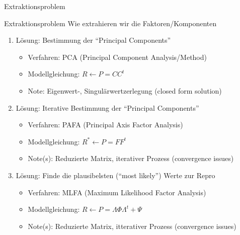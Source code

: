 \documentclass[
  ignorenonframetext,
]{beamer}
\providecommand{\tightlist}{%
  \setlength{\itemsep}{0pt}\setlength{\parskip}{0pt}}
\begin{document}
\begin{frame}{Extraktionsproblem}
\protect\hypertarget{extraktionsproblem}{}
\begin{alertblock}{Extraktionsproblem}
  Wie extrahieren wir die Faktoren/Komponenten 
\end{alertblock}

\begin{enumerate}
\tightlist
\item
  Lösung: Bestimmung der ``Principal Components''

  \begin{itemize}
  \tightlist
  \item
    Verfahren: PCA (Principal Component Analysis/Method)
  \item
    Modellgleichung: \(R \leftarrow P = CC^{t}\)
  \item
    Note: Eigenwert-, Singulärwertzerlegung (closed form solution)
  \end{itemize}
\item
  Lösung: Iterative Bestimmung der ``Principal Components''

  \begin{itemize}
  \tightlist
  \item
    Verfahren: PAFA (Principal Axis Factor Analysis)
  \item
    Modellgleichung: \(R^* \leftarrow P = FF^{t}\)
  \item
    Note(s): Reduzierte Matrix, iterativer Prozess (convergence issues)
  \end{itemize}
\item
  Lösung: Finde die plausibelsten (``most likely'') Werte zur Repro

  \begin{itemize}
  \tightlist
  \item
    Verfahren: MLFA (Maximum Likelihood Factor Analysis)
  \item
    Modellgleichung:
    \(R \leftarrow P = \Lambda \Phi \Lambda^{t} + \Psi\)
  \item
    Note(s): Reduzierte Matrix, itterativer Prozess (convergence issues)
  \end{itemize}
\end{enumerate}
\end{frame}
\end{document}
